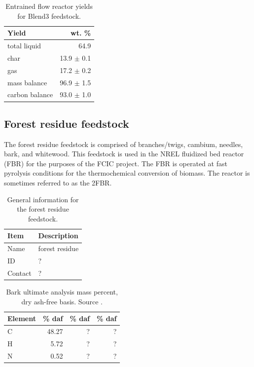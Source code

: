 \begin{table}[H]
    \centering
    \caption{Entrained flow reactor yields for Blend3 feedstock.}
    \label{tab:blend3-efr-yields}
    \begin{tabular}{lr}
        \toprule
        Yield & wt. \% \\
        \midrule
        total liquid   & 64.9 \\
        char           & 13.9 $\pm$ 0.1 \\
        gas            & 17.2 $\pm$ 0.2 \\
        mass balance   & 96.9 $\pm$ 1.5 \\
        carbon balance & 93.0 $\pm$ 1.0 \\
        \bottomrule
    \end{tabular}
\end{table}

\subsection{Forest residue feedstock}

The forest residue feedstock is comprised of branches/twigs, cambium, needles, bark, and whitewood. This feedstock is used in the NREL fluidized bed reactor (FBR) for the purposes of the FCIC project. The FBR is operated at fast pyrolysis conditions for the thermochemical conversion of biomass. The reactor is sometimes referred to as the 2FBR.

\begin{table}[H]
    \centering
    \caption{General information for the forest residue feedstock.}
    \begin{tabular}{ll}
        \toprule
        Item    & Description \\
        \midrule
        Name    & forest residue \\
        ID      & ? \\
        Contact & ? \\
        \bottomrule
    \end{tabular}
\end{table}

\begin{table}[H]
    \centering
    \caption{Bark ultimate analysis mass percent, dry ash-free basis. Source \cite{Unknown-2019}.}
    \begin{tabular}{lrrr}
        \toprule
        Element & \% daf & \% daf & \% daf \\
        \midrule
        C        & 48.27 & ? & ? \\
        H        & 5.72  & ? & ? \\
        N        & 0.52  & ? & ? \\
        \bottomrule
    \end{tabular}
\end{table}

